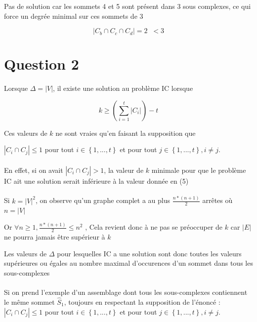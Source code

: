 \documentclass[11pt]{article}
\begin{document}
	Pas de solution car les sommets 4 et 5 sont présent dans 3 sous complexes, 
	ce qui force un degrée minimal sur ces sommets de 3

\begin{equation}
	\left | C_b \cap C_c \cap C_d \right | = 2 \;\; < 3
\end{equation}

\section{Question 2}
\paragraph{}
Lorsque $\Delta = | V |$, il existe une solution au problème IC lorsque

\begin{equation}
	k \geq (\sum_{i=1}^{t} | C_i |) - t
\end{equation}

Ces valeurs de $k$ ne sont vraies qu'en faisant la supposition que 

$|C_i \cap C_j| \leq 1$ pour tout $i \in \left\{1,...,t\right\}$ et pour tout
 $j \in \left\{1,...,t\right\} , i\ne j.$

 \paragraph{}
 En effet, si on avait $|C_i \cap C_j| > 1$, la valeur de $k$ minimale pour que 
le problème IC ait une solution serait inférieure à la valeur donnée en (5)
	

\newpage
\paragraph{}
Si $k = |V|^2$, on observe qu'un graphe complet a au plus $\frac{n*(n+1)}{2}$ arrêtes où $n = |V|$

Or $\forall n \geq 1, \frac{n*(n+1)}{2} \leq n^2$ , Cela revient donc à ne pas se préoccuper de $k$ 
car $|E|$ ne pourra jamais être supérieur à $k$

Les valeurs de $\Delta$ pour lesquelles IC a une solution sont donc toutes les valeurs
supérieures ou égales au nombre maximal d'occurences d'un sommet dans tous les sous-complexes

\paragraph{}
Si on prend l'exemple d'un assemblage dont tous les sous-complexes contiennent le même sommet $\widehat{S}_1$,
toujours en respectant la supposition de l'énoncé : $|C_i \cap C_j| \leq 1$ pour tout $i \in \left\{1,...,t\right\}$ et pour tout
$j \in \left\{1,...,t\right\} , i\ne j.$
\end{document}
